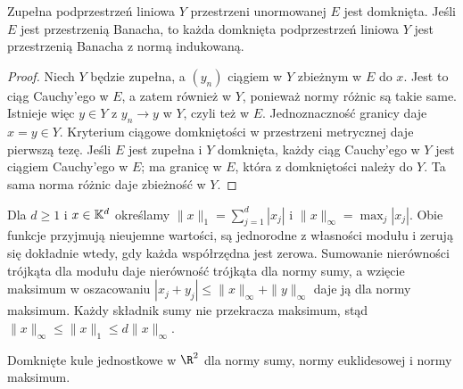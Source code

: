 \begin{twierdzenie}
\label{ma2:thm:closed}
Zupełna podprzestrzeń liniowa $Y$ przestrzeni unormowanej $E$
jest domknięta. Jeśli $E$ jest przestrzenią Banacha, to każda
domknięta podprzestrzeń liniowa $Y$ jest przestrzenią Banacha
z normą indukowaną.
\end{twierdzenie}
\begin{proof}
Niech $Y$ będzie zupełna, a $(y_n)$ ciągiem w $Y$ zbieżnym
w $E$ do $x$. Jest to ciąg Cauchy'ego w $E$, a zatem również
w $Y$, ponieważ normy różnic są takie same. Istnieje więc
$y\in Y$ z $y_n\to y$ w $Y$, czyli też w $E$.
Jednoznaczność granicy daje $x=y\in Y$. Kryterium ciągowe
domkniętości w przestrzeni metrycznej daje pierwszą tezę.
Jeśli $E$ jest zupełna i $Y$ domknięta, każdy ciąg Cauchy'ego
w $Y$ jest ciągiem Cauchy'ego w $E$; ma granicę w $E$,
która z domkniętości należy do $Y$. Ta sama norma różnic
daje zbieżność w $Y$.
\end{proof}
\begin{przyklad}
Dla $d\ge1$ i $x\in\mathbb K^d$ określamy
$\|x\|_1=\sum_{j=1}^d|x_j|$ i $\|x\|_\infty=\max_j|x_j|$.
Obie funkcje przyjmują nieujemne wartości, są jednorodne
z własności modułu i zerują się dokładnie wtedy, gdy każda
współrzędna jest zerowa. Sumowanie nierówności trójkąta dla modułu daje
nierówność trójkąta dla normy sumy, a wzięcie maksimum
w oszacowaniu $|x_j+y_j|\le\|x\|_\infty+\|y\|_\infty$
daje ją dla normy maksimum.
Każdy składnik sumy nie przekracza maksimum, stąd
$\|x\|_\infty\le\|x\|_1\le d\|x\|_\infty$.
\end{przyklad}
\begin{center}

\small Domknięte kule jednostkowe w $\R^2$ dla normy
sumy, normy euklidesowej i normy maksimum.
\end{center}
